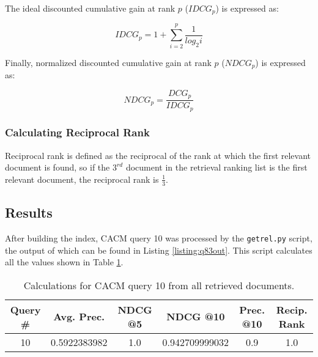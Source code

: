 The ideal discounted cumulative gain at rank \(p\) (\(IDCG_p\)) is expressed as:

\begin{equation}
\nonumber
IDCG_p = 1 + \sum_{i=2}^p \frac{1}{log_2i}
\end{equation}

Finally, normalized discounted cumulative gain at rank \(p\) (\(NDCG_p\)) is expressed as:

\begin{equation}
\nonumber
NDCG_p = \frac{DCG_p}{IDCG_p}
\end{equation}



\subsubsection{Calculating Reciprocal Rank}
Reciprocal rank is defined as the reciprocal of the rank at which the first relevant document is found, so if the \(3^{rd}\) document in the retrieval ranking list is the first relevant document, the reciprocal rank is \(\frac{1}{3}\).


\subsection{Results}
After building the index, CACM query 10 was processed by the \texttt{getrel.py} script, the output of which can be found in Listing \ref{listing:q83out}.  This script calculates all the values shown in Table \ref{tab:q83}.



\begin{table}[h!]
\centering
\begin{tabular}{ | c | c | c | c | c | c | }
\hline
Query \# & Avg. Prec. & NDCG @5 & NDCG @10 & Prec. @10 & Recip. Rank \\
\hline
10 & 0.5922383982 & 1.0 & 0.942709999032 & 0.9 & 1.0 \\
\hline
\end{tabular}
\caption{Calculations for CACM query 10 from all retrieved documents.}
\label{tab:q83}
\end{table}
